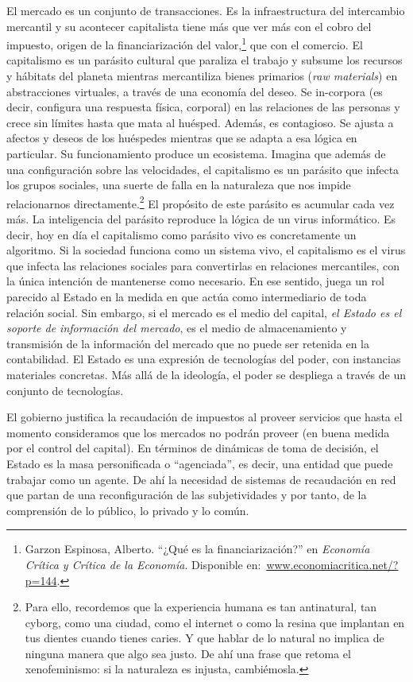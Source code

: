 El mercado es un conjunto de transacciones. Es la infraestructura del intercambio mercantil y su acontecer capitalista tiene más que ver más con el cobro del impuesto, origen de la financiarización del valor,\footnote{Garzon Espinosa, Alberto. \enquote{¿Qué es la financiarización?} en \emph{Economía Crítica y Crítica de la Economía}. Disponible en:~\url{www.economiacritica.net/?p=144}.} que con el comercio. El capitalismo es un parásito cultural que paraliza el trabajo y subsume los recursos y hábitats del planeta mientras mercantiliza bienes primarios (\emph{raw materials}) en abstracciones virtuales, a través de una economía del deseo. Se in-corpora (es decir, configura una respuesta física, corporal) en las relaciones de las personas y crece sin límites hasta que mata al huésped. Además, es contagioso. Se ajusta a afectos y deseos de los huéspedes mientras que se adapta a esa lógica en particular. Su funcionamiento produce un ecosistema. Imagina que además de una configuración sobre las velocidades, el capitalismo es un parásito que infecta los grupos sociales, una suerte de falla en la naturaleza que nos impide relacionarnos directamente.\footnote{Para ello, recordemos que la experiencia humana es tan antinatural, tan cyborg, como una ciudad, como el internet o como la resina que implantan en tus dientes cuando tienes caries. Y que hablar de lo natural no implica de ninguna manera que algo sea justo. De ahí una frase que retoma el xenofeminismo: si la naturaleza es injusta, cambiémosla.} El propósito de este parásito es acumular cada vez más. La inteligencia del parásito reproduce la lógica de un virus informático. Es decir, hoy en día el capitalismo como parásito vivo es concretamente un algoritmo. Si la sociedad funciona como un sistema vivo, el capitalismo es el virus que infecta las relaciones sociales para convertirlas en relaciones mercantiles, con la única intención de mantenerse como necesario. En ese sentido, juega un rol parecido al Estado en la medida en que actúa como intermediario de toda relación social. Sin embargo, si el mercado es el medio del capital, \emph{el Estado es el soporte de información del mercado}, es el medio de almacenamiento y transmisión de la información del mercado que no puede ser retenida en la contabilidad. El Estado es una expresión de tecnologías del poder, con instancias materiales concretas. Más allá de la ideología, el poder se despliega a través de un conjunto de tecnologías.

El gobierno justifica la recaudación de impuestos al proveer servicios que hasta el momento consideramos que los mercados no podrán proveer (en buena medida por el control del capital). En términos de dinámicas de toma de decisión, el Estado es la masa personificada o \enquote{agenciada},\revquotes{} es decir, una entidad que puede trabajar como un agente. De ahí la necesidad de sistemas de recaudación en red que partan de una reconfiguración de las subjetividades y por tanto, de la comprensión de lo público, lo privado y lo común.

